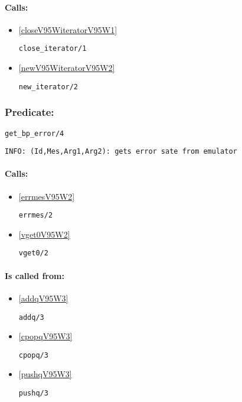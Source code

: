 \paragraph{Calls:} 
\begin{itemize}
\item \ref{closeV95WiteratorV95W1} 
\begin{verbatim}
close_iterator/1
\end{verbatim}

\item \ref{newV95WiteratorV95W2} 
\begin{verbatim}
new_iterator/2
\end{verbatim}

\end{itemize}

\subsubsection{Predicate:} \label{getV95WbpV95WerrorV95W4}

\begin{verbatim}
get_bp_error/4
\end{verbatim}

{\small \begin{verbatim}
INFO: (Id,Mes,Arg1,Arg2): gets error sate from emulator

\end{verbatim}}
\paragraph{Calls:} 
\begin{itemize}
\item \ref{errmesV95W2} 
\begin{verbatim}
errmes/2
\end{verbatim}

\item \ref{vget0V95W2} 
\begin{verbatim}
vget0/2
\end{verbatim}

\end{itemize}
\paragraph{Is called from:} 
\begin{itemize}
\item \ref{addqV95W3} 
\begin{verbatim}
addq/3
\end{verbatim}

\item \ref{cpopqV95W3} 
\begin{verbatim}
cpopq/3
\end{verbatim}

\item \ref{pushqV95W3} 
\begin{verbatim}
pushq/3
\end{verbatim}

\end{itemize}

